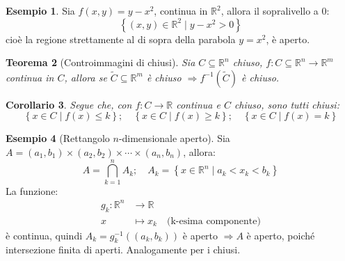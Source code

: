 \documentclass[11pt, a4paper, openright]{book}
\theoremstyle{plain}
\newtheorem{teorema}{Teorema}[section]
\newtheorem{corollario}[teorema]{Corollario}
\theoremstyle{definition}
\newtheorem{esempio}[teorema]{Esempio}
\theoremstyle{remark}
\begin{document}
\begin{esempio}
    Sia $f(x, y) = y - x^2$, continua in $\mathbb{R}^2$, allora il sopralivello a $0$:
    \begin{equation}
        \left\{(x, y) \in \mathbb{R}^2 \mid y - x^2 > 0\right\}
    \end{equation}
    cioè la regione strettamente al di sopra della parabola $y = x^2$, è aperto.
\end{esempio}

\begin{teorema}[Controimmagini di chiusi]
    Sia $C \subseteq \mathbb{R}^n$ chiuso, $f: C \subseteq \mathbb{R}^n \longrightarrow \mathbb{R}^m$ continua in $C$, allora se $\tilde{C} \subseteq \mathbb{R}^m$ è chiuso $\Longrightarrow f^{-1}(\tilde{C})$ è chiuso.
\end{teorema}

\begin{corollario}
    Segue che, con $f: C \longrightarrow \mathbb{R}$ continua e $C$ chiuso, sono tutti chiusi:
    \begin{equation}
        \left\{x \in C \mid f(x) \leq k\right\}; \quad \left\{x \in C \mid f(x) \geq k\right\}; \quad \left\{x \in C \mid f(x) = k\right\}
    \end{equation}
\end{corollario}

\begin{esempio}[Rettangolo $n$-dimensionale aperto]
    Sia $A = (a_1, b_1) \times (a_2, b_2) \times \cdots \times (a_n, b_n)$, allora:
    \begin{equation}
        A = \bigcap_{k = 1}^{n} A_k; \quad A_k = \left\{x \in \mathbb{R}^n \mid a_k < x_k < b_k\right\}
    \end{equation}
    La funzione:
    \begin{equation}
        \begin{aligned}
            g_k: \mathbb{R}^n &\longrightarrow \mathbb{R} \\
            x &\longmapsto x_k \quad \text{(k-esima componente)}
        \end{aligned}
    \end{equation}
    è continua, quindi $A_k = g_k^{-1}((a_k, b_k))$ è aperto $\Longrightarrow A$ è aperto, poiché intersezione finita di aperti. Analogamente per i chiusi.
\end{esempio}
\end{document}
